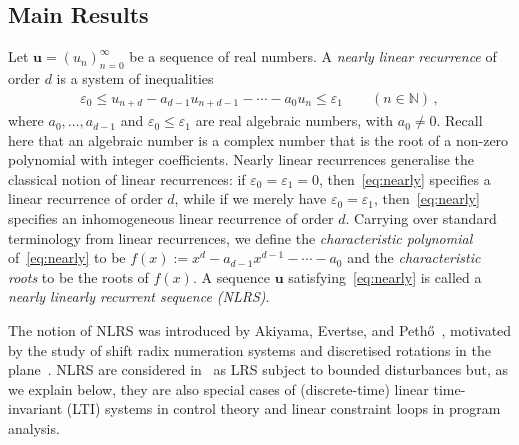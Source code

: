 \documentclass[a4paper,UKenglish,cleveref, autoref, thm-restate]{lipics-v2021}
\begin{document}
\subsection{Main Results}
Let $\boldsymbol u = (u_n)_{n=0}^\infty$ be a sequence of real numbers.
A \emph{nearly linear recurrence} of order $d$ is a system of inequalities 
\begin{gather}
     \varepsilon_0 \leq u_{n+d} - a_{d-1}u_{n+d-1}-\cdots - a_{0}u_n \leq \varepsilon_1 \qquad (n\in \mathbb N)\, ,
\label{eq:nearly}
\end{gather}
where $a_0,\ldots,a_{d-1}$ and $\varepsilon_0 \leq \varepsilon_1$ are real algebraic numbers, with $a_0\neq 0$.
Recall here that an algebraic number is a complex number that is the root of a non-zero polynomial with integer 
coefficients.
Nearly linear recurrences generalise the classical notion of linear recurrences:
if $\varepsilon_0=\varepsilon_1=0$, then~\eqref{eq:nearly} specifies a linear recurrence of order $d$, while
if we merely have $\varepsilon_0=\varepsilon_1$, then~\eqref{eq:nearly} specifies 
an inhomogeneous linear recurrence of order $d$.  %
Carrying over standard terminology from linear recurrences,
we define the \emph{characteristic polynomial} of~\eqref{eq:nearly} to be
$f(x):=x^d - a_{d-1}x^{d-1} - \cdots - a_0$ and the \emph{characteristic roots} 
to be the roots of $f(x)$.  A sequence $\boldsymbol u$ satisfying~\eqref{eq:nearly} is called a \emph{nearly linearly recurrent sequence (NLRS)}.  

The notion of NLRS was introduced by Akiyama, Evertse, and
Peth\H{o}~\cite{Akiyama2017}, motivated by the study of shift radix
numeration systems and discretised rotations in the
plane~\cite{Akiyama2013}.  NLRS are considered in~\cite{Akiyama2017}
as LRS subject to bounded disturbances but, as we explain below, 
they are also
special cases of (discrete-time) linear time-invariant (LTI) systems in control theory 
and linear constraint loops in program analysis.

\end{document}
